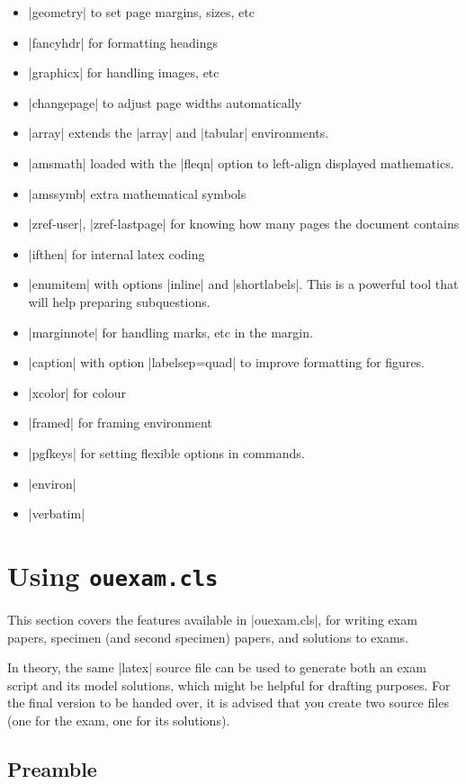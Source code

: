 \documentclass[a4paper]{ltxguide}
\newcommand\3{\unskip\enspace\fbox{\fontsize{4}{4}\selectfont NEW 3.0}}
\begin{document}
\begin{itemize}
\item |geometry| to set page margins, sizes, etc
\item |fancyhdr| for formatting headings
\item |graphicx| for handling images, etc
\item |changepage| to adjust page widths automatically
\item |array| extends the |array| and |tabular| environments.
\item |amsmath| loaded with the |fleqn| option to left-align displayed mathematics.
\item |amssymb| extra mathematical symbols
\item |zref-user|, |zref-lastpage| for knowing how many pages the document contains
\item |ifthen| for internal latex coding
\item |enumitem| with options |inline| and |shortlabels|. This is a powerful tool that will help preparing subquestions.
\item |marginnote| for handling marks, etc in the margin.
\item |caption| with option |labelsep=quad| to improve formatting for figures.
\item |xcolor| for colour
\item |framed| for framing environment
\item |pgfkeys| for setting flexible options in commands.
\item |environ|
\item |verbatim|
\end{itemize}



%
%
%
%
%
%
%
%
%
%
\section{Using \texttt{ouexam.cls}}

This section covers the features available in |ouexam.cls|, for writing exam papers, specimen (and second specimen) papers, and solutions to exams. 

In theory, the same |latex| source file can be used to generate both an exam script and its model solutions, which might be helpful for drafting purposes. For the final version to be handed over, it is advised that you create two source files (one for the exam, one for its solutions).

\subsection{Preamble}
\end{document}
